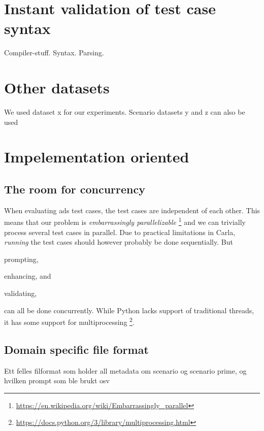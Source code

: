 \section{Instant validation of test case syntax}
Compiler-stuff. Syntax. Parsing.


\section{Other datasets}

We used dataset x for our experiments. Scenario datasets y and z can also be used

\section{Impelementation oriented}

\subsection{The room for concurrency}

When evaluating \acrshort{ads} test cases, the test cases are independent of each
other. This means that our problem is \textit{embarrassingly parallelizable}
\footnote{\url{https://en.wikipedia.org/wiki/Embarrassingly_parallel}} and we can
trivially process several test cases in parallel. Due to practical limitations
in Carla, \textit{running} the test cases should however probably be done
sequentially. But \begin{inparaenum}
    \item prompting,
    \item enhancing, and
    \item validating,
\end{inparaenum}
can all be done concurrently. While Python lacks support of traditional threads,
it has some support for multiprocessing
\footnote{\url{https://docs.python.org/3/library/multiprocessing.html}}.

\subsection{Domain specific file format}

Ett felles filformat som holder all metadata om scenario og scenario prime, og
hvilken prompt som ble brukt osv